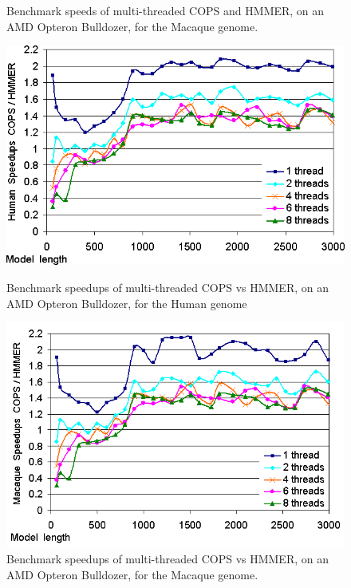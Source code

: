 \begin{figure}[h!]
\begin{minipage}{0.48\linewidth}
		\caption[Speeds of the multi-threaded COPS and HMMER, AMD Opteron, Macaque] 
		{Benchmark speeds of multi-threaded COPS and HMMER, on an AMD Opteron Bulldozer, for the Macaque genome.}
		\label{threads-aleph-runtimes-macaque}
    \end{minipage}
\end{figure} 

\begin{figure}[h!]
    \begin{minipage}{0.48\linewidth}
		\centering
		\includegraphics[scale=0.46]{graphics/threads-aleph-speedups-human.png}
		\caption[Speedups of the multi-threaded COPS vs HMMER, AMD Opteron, Human] 
		{Benchmark speedups of multi-threaded COPS vs HMMER, on an AMD Opteron Bulldozer, for the Human genome}
		\label{threads-aleph-speedups-human}
    \end{minipage}
    \hspace{0.04\linewidth}
    \begin{minipage}{0.48\linewidth}
		\centering
		\includegraphics[scale=0.46]{graphics/threads-aleph-speedups-macaque.png}
		\caption[Speedups of the multi-threaded COPS vs HMMER, AMD Opteron, Macaque] 
		{Benchmark speedups of multi-threaded COPS vs HMMER, on an AMD Opteron Bulldozer, for the Macaque genome.}
		\label{threads-aleph-speedups-macaque}
    \end{minipage}
\end{figure} 

